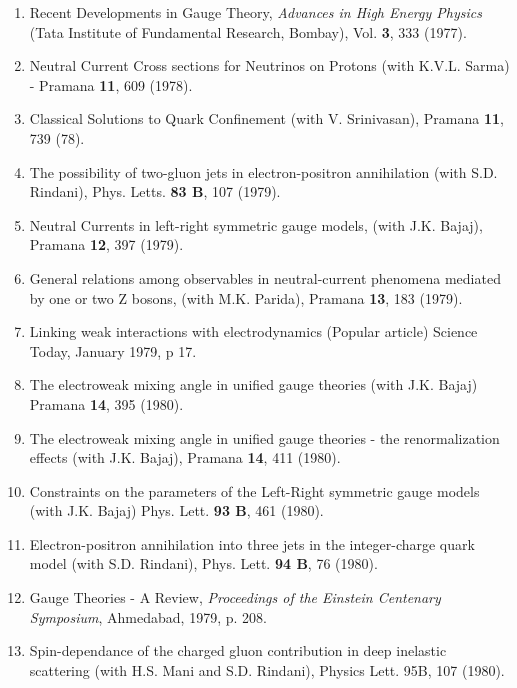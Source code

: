 \begin{enumerate}
\item Recent Developments in Gauge Theory, {\it Advances in High Energy
Physics} (Tata Institute of Fundamental Research, Bombay),
Vol. {\bf 3}, 333 (1977).

\item Neutral Current Cross sections for Neutrinos on Protons (with
K.V.L. Sarma) - Pramana {\bf 11}, 609 (1978).

\item Classical Solutions to Quark Confinement (with V. Srinivasan),
Pramana {\bf 11}, 739 (78).

\item The possibility of two-gluon jets in electron-positron
annihilation (with S.D. Rindani), Phys. Letts. {\bf 83 B}, 107 (1979).

\item Neutral Currents in left-right symmetric gauge models, (with J.K.
Bajaj), Pramana {\bf 12}, 397 (1979).

\item General relations among observables in neutral-current phenomena
mediated by one or two Z bosons, (with M.K. Parida), Pramana {\bf 13},
183 (1979).

\item Linking weak interactions with electrodynamics (Popular article)
Science Today, January 1979, p 17.

\item The electroweak mixing angle in unified gauge theories (with J.K.
Bajaj) Pramana {\bf 14}, 395 (1980).

\item The electroweak mixing angle in unified gauge theories - the
renormalization effects (with J.K. Bajaj), Pramana {\bf 14}, 411
(1980).

\item Constraints on the parameters of the Left-Right symmetric gauge
models (with J.K. Bajaj) Phys. Lett. {\bf 93 B}, 461 (1980).

\item Electron-positron annihilation into three jets in the
integer-charge quark model (with S.D. Rindani), Phys. Lett. {\bf 94 B},
76 (1980).

\item Gauge Theories - A Review, {\it Proceedings of the Einstein Centenary
Symposium}, Ahmedabad, 1979, p. 208.

\item Spin-dependance of the charged gluon contribution in deep
inelastic scattering (with H.S. Mani and S.D. Rindani), Physics Lett.
95B, 107 (1980).


\end{enumerate}

